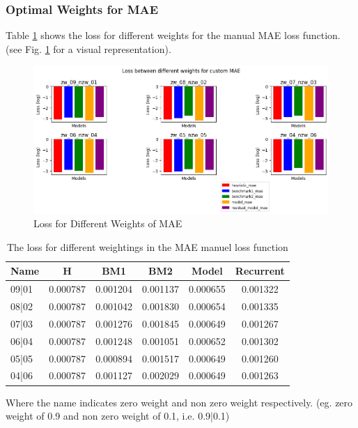 \subsubsection*{Optimal Weights for MAE}
Table \ref{tab:weights} shows the loss for different weights for the manual MAE loss function. (see Fig. \ref{fig:MAE-weights-init} for a visual representation). 
\begin{figure}[tbph]
	\centering
	\includegraphics[width=0.9\linewidth, height=0.5\textheight]{Figures/Results/Shuffle_Weights/weights/weights}
	\caption[Loss for Different Weights of MAE]{Loss for Different Weights of MAE}
	\label{fig:MAE-weights-init}
\end{figure}

\begin{table}[htbp]
	\centering
	\caption{The loss for different weightings in the MAE manuel loss function}
	\label{tab:weights}
	\begin{tabular}{p{2cm}ccccc}
		\toprule
		Name &  H &  BM1 &  BM2 &  Model &  Recurrent \\
		\midrule
		09|01 &       0.000787 &        0.001204 &        0.001137 &   0.000655 &            0.001322 \\
		08|02 &       0.000787 &        0.001042 &        0.001830 &   0.000654 &            0.001335 \\
		07|03 &       0.000787 &        0.001276 &        0.001845 &   0.000649 &            0.001267 \\
		06|04 &       0.000787 &        0.001248 &        0.001051 &   0.000652 &            0.001302 \\
		05|05 &       0.000787 &        0.000894 &        0.001517 &   0.000649 &            0.001260 \\
		04|06 &       0.000787 &        0.001127 &        0.002029 &   0.000649 &            0.001263 \\
		\bottomrule
	\end{tabular}
\end{table}
Where the name indicates zero weight and non zero weight respectively. (eg. zero weight of 0.9 and non zero weight of 0.1, i.e. 0.9|0.1)
